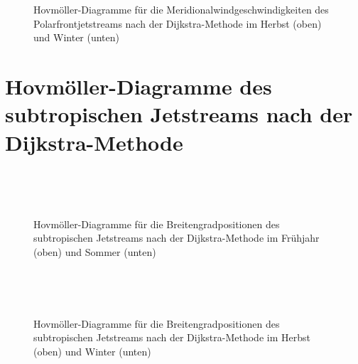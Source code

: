 \begin{figure}
  \centering
  \begin{minipage}{\textwidth}
  \end{minipage} \\ 
    \begin{minipage}{\textwidth}
  \end{minipage} \\ 
  \caption[Hovmöllerdiagramme des Meridionalwinds des Polarfrontjets nach Dijkstra im Herbst und Winter]{Hovmöller-Diagramme für die Meridionalwindgeschwindigkeiten des Polarfrontjetstreams nach der Dijkstra-Methode im Herbst (oben) und Winter (unten)} 
\end{figure}




\newpage
\section{Hovmöller-Diagramme des subtropischen Jetstreams nach der Dijkstra-Methode} 

\begin{figure} %
  \centering
  \begin{minipage}{\textwidth}
  \end{minipage} \\ 
    \begin{minipage}{\textwidth}
  \end{minipage} \\ 
  \caption[Hovmöllerdiagramme der Positionen des Subtropenjets nach Dijkstra im Frühjahr und Sommer]{Hovmöller-Diagramme für die Breitengradpositionen des subtropischen Jetstreams nach der Dijkstra-Methode im Frühjahr (oben) und Sommer (unten)}
\end{figure}

\begin{figure}
  \centering
  \begin{minipage}{\textwidth}
  \end{minipage} \\ 
    \begin{minipage}{\textwidth}
  \end{minipage} \\ 
  \caption[Hovmöllerdiagramme der Positionen des Subtropenjets nach Dijkstra im Herbst und Winter]{Hovmöller-Diagramme für die Breitengradpositionen des subtropischen Jetstreams nach der Dijkstra-Methode im Herbst (oben) und Winter (unten)}
\end{figure}

